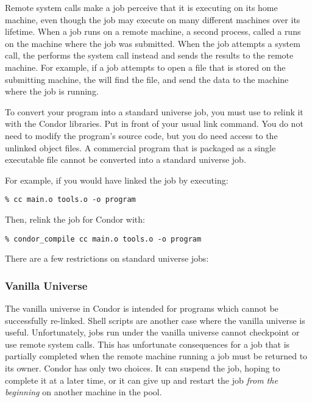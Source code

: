 Remote system calls make a job perceive that it is executing on its home
machine, even though the job may execute on many different machines over its
lifetime.
When a job runs on a remote machine, a second process, called
a  runs on the machine where the job was submitted.
When the job attempts a system call, the  performs
the system call instead and sends the results to the remote
machine.
For example, if a job attempts to open a file that is
stored on the submitting machine,
the  will find the file,
and send the data to the machine where
the job is running.

To convert your program into a standard universe job, you must use
 to relink it with the Condor libraries.
Put  in front of your usual link command.
You do not need to modify the program's source code,
but you do need access to the unlinked object files.
A commercial program that is packaged as a single executable file cannot be
converted into a standard universe job.

For example, if you would have linked the job by executing:
\begin{verbatim}
% cc main.o tools.o -o program
\end{verbatim}

Then, relink the job for Condor with:
\begin{verbatim}
% condor_compile cc main.o tools.o -o program
\end{verbatim}

There are a few restrictions on standard universe jobs:




\subsubsection{Vanilla Universe}

The vanilla universe in Condor is intended
for programs which cannot
be successfully re-linked.
Shell scripts are another case where the vanilla universe
is useful.
Unfortunately, jobs run under the vanilla universe cannot checkpoint or use
remote system calls. 
This has unfortunate consequences for a job that is partially
completed 
when the remote machine running a job must be returned
to its owner.
Condor has only two choices.  It can suspend the job, hoping to
complete it at a later time,
or it can give up and restart the job \emph{from the beginning} 
on another machine in the pool.

